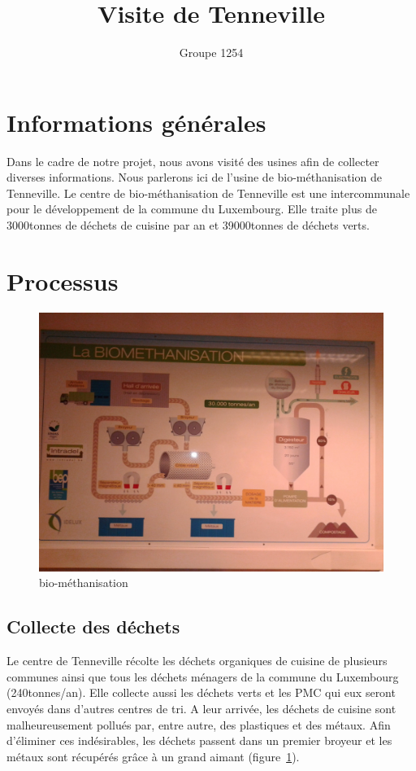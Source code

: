 \documentclass{article}
\title{Visite de Tenneville}
\author{Groupe 1254}
\begin{document}
\maketitle
\section{Informations générales}
Dans le cadre de notre projet, nous avons visité des usines afin de collecter diverses informations.
Nous parlerons ici de l'usine de bio-méthanisation de Tenneville.
Le centre de bio-méthanisation de Tenneville est une intercommunale pour le développement de la commune du Luxembourg.
Elle traite plus de \unit{3000}{tonnes} de déchets de cuisine par an et \unit{39000}{tonnes} de déchets verts.
\section{Processus}
\begin{figure}
  \centering
  \includegraphics[scale=0.07]{IMG_20141105_105627.jpg}
  \caption{bio-méthanisation}
  \label{fig:biomethanisation}
\end{figure}
\subsection{Collecte des déchets}
Le centre de Tenneville récolte les déchets organiques de cuisine de plusieurs communes ainsi que tous les déchets ménagers de la commune du Luxembourg (\unit{240}{tonnes/an}). Elle collecte aussi les déchets verts et les PMC qui eux seront envoyés dans d'autres centres de tri.
A leur arrivée, les déchets de cuisine sont malheureusement pollués par, entre autre, des plastiques  et des métaux. Afin d'éliminer ces indésirables, les déchets passent dans un premier broyeur et les métaux sont récupérés grâce à un grand aimant (figure~\ref{fig:biomethanisation}). 
\end{document}
